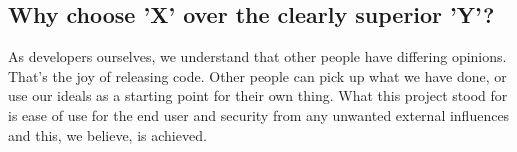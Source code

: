 \subsection{Why choose 'X' over the clearly superior 'Y'?}
As developers ourselves, we understand that other people have differing opinions.
That's the joy of releasing code.  Other people can pick up what we have done,
or use our ideals as a starting point for their own thing.  What this project
stood for is ease of use for the end user and security from any unwanted external
influences and this, we believe, is achieved.
